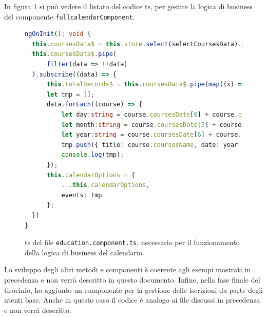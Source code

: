 In figura \ref{fig:fullcalendar.ts} si può vedere il listato del codice \acrlong{ts}, per gestire la logica di business del componente \texttt{fullcalendarComponent}.

\begin{figure}[H]
\centering
\begin{lstlisting}[language=TypeScript]
ngOnInit(): void {
  this.coursesData$ = this.store.select(selectCoursesData).pipe(startWith( this.route .snapshot.data.CoursesData));
  this.coursesData$.pipe(
      filter(data => !!data)
  ).subscribe((data) => {
      this.totalRecords$ = this.coursesData$.pipe(map((x) => (x ? (x[0] ? x[0].count : 0) : 0)));
      let tmp = [];
      data.forEach((course) => {
          let day:string = course.coursesDate[0] + course.coursesDate[1];
          let month:string = course.coursesDate[3] + course.coursesDate[4];
          let year:string = course.coursesDate[6] + course.coursesDate[7] + course.coursesDate[8] + course.coursesDate[9];
          tmp.push({ title: course.coursesName, date: year + '-' + month + '-' + day }); // yyy-mm-dd
          console.log(tmp);
      });
      this.calendarOptions = {
          ...this.calendarOptions,
          events: tmp
      };
  })
}
\end{lstlisting}
\caption{\label{fig:fullcalendar.ts}\acrlong{ts} del file \texttt{education.component.ts}, necessario per il funzionamento della logica di business del calendario.}
\end{figure}

Lo sviluppo degli altri metodi e componenti è coerente agli esempi mostrati in precedenza e non verrà descritto in questo documento.
Infine, nella fase finale del tirocinio, ho aggiunto un componente per la gestione delle iscrizioni da parte degli utenti base. 
Anche in questo caso il codice è analogo ai file discussi in precedenza e non verrà descritto.


